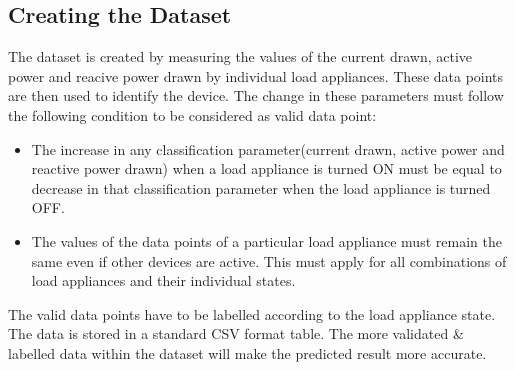 \subsection{Creating the Dataset}{
The dataset is created by measuring the values of the current drawn, active power and reacive power drawn by individual load appliances. These data points are then used to identify the device.
The change in these parameters must follow the following condition to be considered as valid data point:
\begin{itemize}
    \item The increase in any classification parameter(current drawn, active power and reactive power drawn) when a load appliance is turned ON must be equal to decrease in that classification parameter when the load appliance is turned OFF.
    \item The values of the data points of a particular load appliance must remain the same even if other devices are active. This must apply for all combinations of load appliances and their individual states.
\end{itemize}

The valid data points have to be labelled according to the load appliance state. 
The data is stored in a standard CSV format table.
The more validated & labelled data within the dataset will make the predicted result more accurate. 

}

